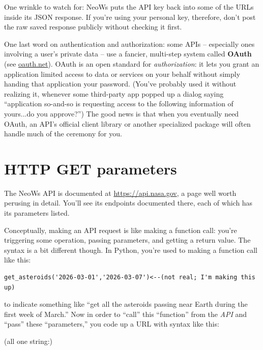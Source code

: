 One wrinkle to watch for: NeoWs puts the API key back into some of the URLs
inside its JSON response. If you're using your personal key, therefore, don't
post the raw saved response publicly without checking it first.


One last word on authentication and authorization: some APIs -- especially
ones involving a user's private data -- use a fancier, multi-step system
called \textbf{OAuth} (see \url{oauth.net}). OAuth is an open standard for
\textit{authorization}: it lets you grant an application limited access to
data or services on your behalf without simply handing that application your
password. (You've probably used it without realizing it, whenever some
third-party app popped up a dialog saying ``application so-and-so is
requesting access to the following information of yours...do you approve?'')
The good news is that when you eventually need OAuth, an API's official client
library or another specialized package will often handle much of the ceremony
for you.

\section{HTTP GET parameters}

The NeoWs API is documented at \url{https://api.nasa.gov}, a page well worth
perusing in detail. You'll see its endpoints documented there, each of which
has its parameters listed.

Conceptually, making an API request is like making a function call: you're
triggering some operation, passing parameters, and getting a return value. The
syntax is a bit different though. In Python, you're used to making a function
call like this:

\begin{Verbatim}[fontsize=\scriptsize,samepage=true,frame=single,framesep=3mm]
get_asteroids('2026-03-01','2026-03-07')<--(not real; I'm making this up)
\end{Verbatim}

to indicate something like ``get all the asteroids passing near Earth during
the first week of March.'' Now in order to ``call'' this ``function'' from the
\textit{API} and ``pass'' these ``parameters,'' you code up a URL with syntax
like this:

\begin{center}
\scriptsize{(all one string:)}
\end{center}

